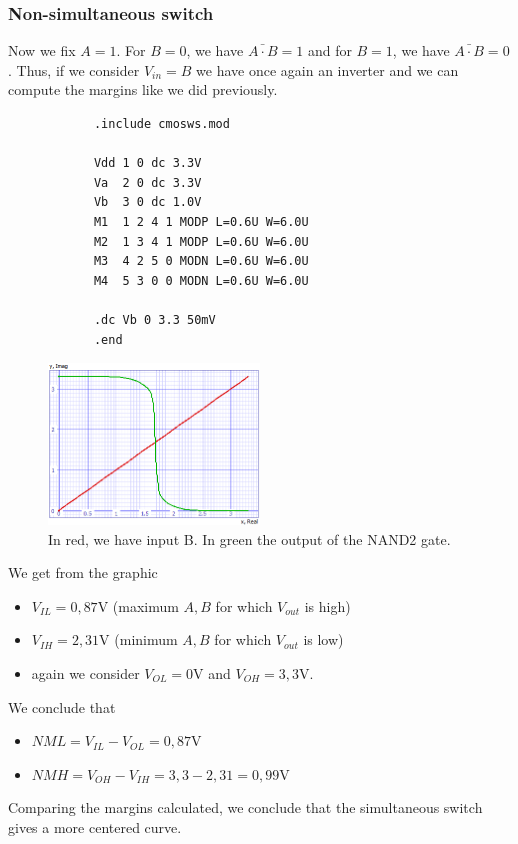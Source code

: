 \documentclass[../main.tex]{subfiles}
\begin{document}
{	\subsubsection{Non-simultaneous switch}
	{
		Now we fix $A = 1$. For $B=0$, we have $\bar{A \cdot B} = 1$ and for $B = 1$, we have $\bar{A \cdot B} = 0$. Thus, if we consider $V_{in} = B$ we have once again an inverter and we can compute the margins like we did previously.
		
		\begin{lstlisting}
			.include cmosws.mod
			
			Vdd 1 0 dc 3.3V
			Va  2 0 dc 3.3V
			Vb  3 0 dc 1.0V
			M1  1 2 4 1 MODP L=0.6U W=6.0U
			M2  1 3 4 1 MODP L=0.6U W=6.0U
			M3  4 2 5 0 MODN L=0.6U W=6.0U
			M4  5 3 0 0 MODN L=0.6U W=6.0U
			
			.dc Vb 0 3.3 50mV
			.end
		\end{lstlisting}
		
		\begin{figure}[H]
			\centering
			\includegraphics[width=0.5\textwidth]{plots/Q5_1.png}
			\caption{In red, we have input B. In green the output of the NAND2 gate.}
		\end{figure}
		
		We get from the graphic
		
		\begin{itemize}
			\item $V_{IL} = 0,87$V (maximum $A,B$ for which $V_{out}$ is high)
			\item $V_{IH} = 2,31$V (minimum $A,B$ for which $V_{out}$ is low)
			\item again we consider $V_{OL} = 0$V and $V_{OH} = 3,3$V.
		\end{itemize}
		
		We conclude that
		\begin{itemize}
			\item $NML = V_{IL} - V_{OL} = 0,87$V
			\item $NMH = V_{OH} - V_{IH} = 3,3 - 2,31 = 0,99$V
		\end{itemize}
		
		Comparing the margins calculated, we conclude that the simultaneous switch gives a more centered curve.
	}
	
	}
\end{document}

